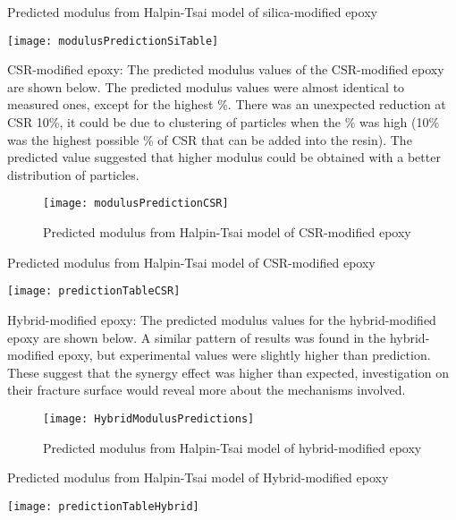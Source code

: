 \documentclass[numbers=noendperiod,chapterprefix=on]{icldt} %
\begin{document}
\begin{table}[!htpb]
\centering
\caption{Predicted modulus from Halpin-Tsai model of silica-modified epoxy} %
\texttt{[image: modulusPredictionSiTable]}
\end{table}
\FloatBarrier

CSR-modified epoxy: 
\newline
The predicted modulus values of the CSR-modified epoxy are shown below. The predicted modulus values were almost identical to measured ones, except for the highest \%. There was an unexpected reduction at CSR 10\%, it could be due to clustering of particles when the \% was high (10\% was the highest possible \% of CSR that can be added into the resin). The predicted value suggested that higher modulus could be obtained with a better distribution of particles. 

\begin{figure}[!htpb]
\centering
\texttt{[image: modulusPredictionCSR]}
\caption{Predicted modulus from Halpin-Tsai model of CSR-modified epoxy}
\end{figure}
\FloatBarrier

\begin{table}[!htpb]
\centering
\caption{Predicted modulus from Halpin-Tsai model of CSR-modified epoxy } %
\texttt{[image: predictionTableCSR]}
\end{table}
\FloatBarrier

Hybrid-modified epoxy:
\newline
The predicted modulus values for the hybrid-modified epoxy are shown below. A similar pattern of results was found in the hybrid-modified epoxy, but experimental values were slightly higher than prediction. These suggest that the synergy effect was higher than expected, investigation on their fracture surface would reveal more about the mechanisms involved. 

\begin{figure}[!htpb]
\centering
\texttt{[image: HybridModulusPredictions]}
\caption{Predicted modulus from Halpin-Tsai model of hybrid-modified epoxy }
\end{figure}
\FloatBarrier

\begin{table}[!htpb]
\centering
\caption{Predicted modulus from Halpin-Tsai model of Hybrid-modified epoxy } %
\texttt{[image: predictionTableHybrid]}
\end{table}
\FloatBarrier
\end{document}
